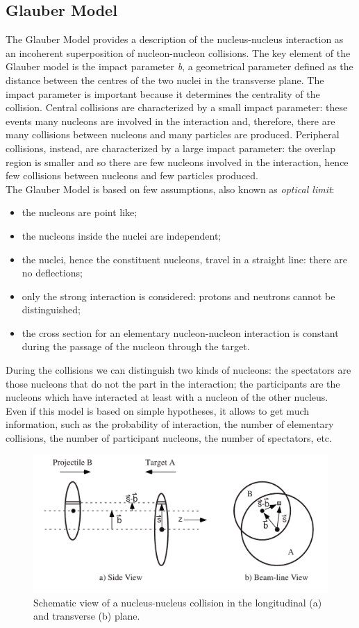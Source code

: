 \subsection{Glauber Model}
The Glauber Model provides a description of the nucleus-nucleus interaction as an incoherent superposition of nucleon-nucleon collisions.
The key element of the Glauber model is the impact parameter \textit{b}, a geometrical parameter defined as the distance between the centres of the two nuclei in the transverse plane. The impact parameter is important because it determines the centrality of the collision. Central collisions are characterized by a small impact parameter: these events many nucleons are involved in the interaction and, therefore, there are many collisions between nucleons and many particles are produced. Peripheral collisions, instead, are characterized by a large impact parameter: the overlap region is smaller and so there are few nucleons involved in the interaction, hence few collisions between nucleons and few particles produced.\\
The Glauber Model is based on few assumptions, also known as \textit{optical limit}:
\begin{itemize}
 \item the nucleons are point like;
 \item the nucleons inside the nuclei are independent;
 \item the nuclei, hence the constituent nucleons, travel in a straight line: there are no deflections;
 \item only the strong interaction is considered: protons and neutrons cannot be distinguished;
 \item the cross section for an elementary nucleon-nucleon interaction is constant during the passage of the nucleon through the target.
\end{itemize}
During the collisions we can distinguish two kinds of nucleons: the spectators are those nucleons that do not the part in the interaction; the participants are the nucleons which have interacted at least with a nucleon of the other nucleus.\\
Even if this model is based on simple hypotheses, it allows to get much information, such as the probability of interaction, the number of elementary collisions, the number of participant nucleons, the number of spectators, etc.
%
\begin{figure}
  \centering
  \includegraphics[scale=0.30]{figures/Impact_parameter.png}
  \caption{Schematic view of a nucleus-nucleus collision in the longitudinal (a) and transverse (b) plane.}
  \label{fig:impact}
\end{figure}
%
